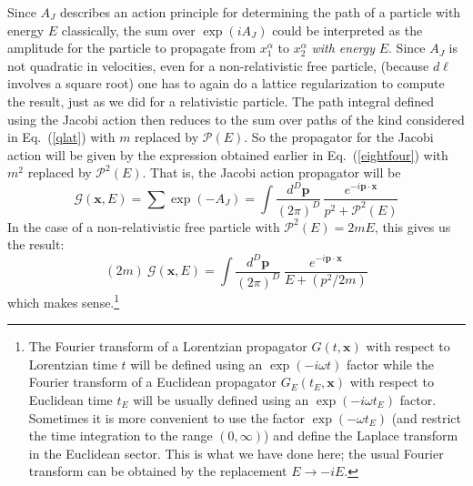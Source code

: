 \documentclass{article}
\def\eq#1{{Eq.~(\ref{#1})}}
\begin{document}
Since $A_J$ describes an  action principle for determining the path of a particle with energy $E$ classically, the sum over $\exp(iA_J)$ could be interpreted  as the amplitude for the particle to propagate from $x^\alpha_1$ to  $x^\alpha_2$ \textit{with energy} $E$.  Since $A_J$ is not quadratic 
in velocities,  even for a non-relativistic free particle, (because $d\ell  $ involves a square root) one has to  again do a lattice regularization to compute the result, just as we did for a relativistic particle. The path integral defined using the Jacobi action then reduces to the sum over paths of the kind considered in \eq{qlat} with $m$ replaced by $\mathcal{P}(E)$. So the propagator for the Jacobi action will be given by the expression obtained earlier in \eq{eightfour} with $m^2$ replaced by $\mathcal{P}^2(E)$. That is, the Jacobi action propagator will be 
\begin{equation}
 \mathcal{G}(\bm{x},E) = \sum\exp (-A_J)=\int \frac{d^D\bm{p}}{(2\pi)^D} \, \frac{ e^{-i\bm{p\cdot x}}}{p^2+\mathcal{P}^2(E)}
\end{equation} 
In the case of a non-relativistic free particle with $\mathcal{P}^2(E) = 2mE$,  this gives us the result:
\begin{equation}
 (2m) \ \mathcal{G}(\bm{x},E) = \int \frac{d^D\bm{p}}{(2\pi)^D}\ \frac{e^{-i\bm{p\cdot x}}}{E + (p^2/2m)}
\end{equation} 
which makes sense.\footnote{The Fourier transform of a Lorentzian propagator $G(t, \bm{x})$ with respect to Lorentzian time $t$ will be defined using an $\exp(-i\omega t)$ factor while the Fourier transform of a Euclidean propagator $G_E(t_E, \bm{x})$ with respect to Euclidean time $t_E$ will be usually defined using an $\exp(-i\omega t_E)$ factor. Sometimes it is more convenient to use the factor $\exp(-\omega t_E)$ (and restrict the time integration to the range $(0,\infty)$) and define the Laplace transform in the Euclidean sector. This is what we have done here; the usual Fourier transform can be obtained by the replacement $E\to -iE$.}
\end{document}
